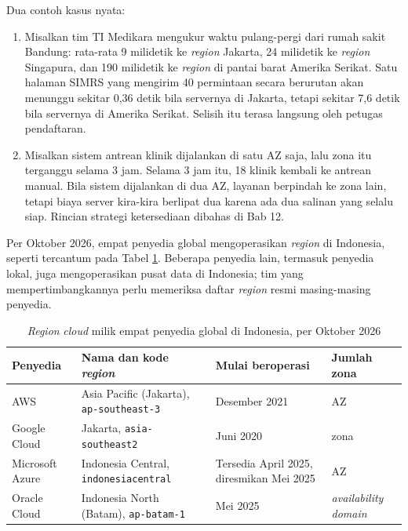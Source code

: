 Dua contoh kasus nyata:
\begin{enumerate}
  \item Misalkan tim TI Medikara mengukur waktu pulang-pergi dari rumah sakit Bandung:
        rata-rata 9 milidetik ke \textit{region} Jakarta, 24 milidetik ke \textit{region}
        Singapura, dan 190 milidetik ke \textit{region} di pantai barat Amerika Serikat.
        Satu halaman SIMRS yang mengirim 40 permintaan secara berurutan akan menunggu sekitar
        0,36 detik bila servernya di Jakarta, tetapi sekitar 7,6 detik bila servernya di
        Amerika Serikat. Selisih itu terasa langsung oleh petugas pendaftaran.
  \item Misalkan sistem antrean klinik dijalankan di satu AZ saja, lalu zona itu terganggu
        selama 3 jam. Selama 3 jam itu, 18 klinik kembali ke antrean manual. Bila sistem
        dijalankan di dua AZ, layanan berpindah ke zona lain, tetapi biaya server kira-kira
        berlipat dua karena ada dua salinan yang selalu siap. Rincian strategi ketersediaan
        dibahas di Bab 12.
\end{enumerate}

Per Oktober 2026, empat penyedia global mengoperasikan \textit{region} di Indonesia, seperti
tercantum pada Tabel \ref{tab:ch02-region-indonesia}. Beberapa penyedia lain, termasuk
penyedia lokal, juga mengoperasikan pusat data di Indonesia; tim yang mempertimbangkannya
perlu memeriksa daftar \textit{region} resmi masing-masing penyedia.

\begin{table}[!htb]
  \centering
  \caption{\textit{Region} \textit{cloud} milik empat penyedia global di Indonesia, per
           Oktober 2026}
  \label{tab:ch02-region-indonesia}
  \small
  \begin{tabularx}{\textwidth}{>{\raggedright\arraybackslash}p{2.0cm}
      >{\raggedright\arraybackslash}X >{\raggedright\arraybackslash}p{2.6cm}
      >{\raggedright\arraybackslash}p{2.3cm}}
    \hline
    \textbf{Penyedia} & \textbf{Nama dan kode \textit{region}} & \textbf{Mulai beroperasi} &
      \textbf{Jumlah zona} \\
    \hline
    AWS & Asia Pacific (Jakarta), \texttt{ap-southeast-3} & Desember 2021
      \cite{c02-aws-jakarta} & 3 AZ \\
    \hline
    Google Cloud & Jakarta, \texttt{asia-southeast2} & Juni 2020 \cite{c02-gcp-jakarta} & 3
      zona \\
    \hline
    Microsoft Azure & Indonesia Central, \texttt{indonesiacentral} & Tersedia April 2025,
      diresmikan Mei 2025 \cite{c02-azure-indonesia} & 3 AZ \\
    \hline
    Oracle Cloud & Indonesia North (Batam), \texttt{ap-batam-1} & Mei 2025
      \cite{c02-oci-batam} & 1 \textit{availability domain} \\
    \hline
  \end{tabularx}
\end{table}

